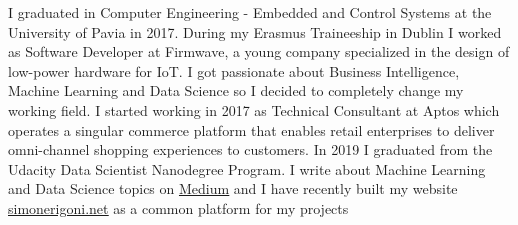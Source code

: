 \documentclass[9pt]{developercv} %
\begin{document}
\begin{minipage}[t]{0.5\textwidth} %
	\vspace{-\baselineskip} %
	
	I graduated in Computer Engineering - Embedded and Control Systems at the University of Pavia in 2017. During my Erasmus Traineeship in Dublin I worked as Software Developer at Firmwave, a young company specialized in the design of low-power hardware for IoT. I got passionate about Business Intelligence, Machine Learning and Data Science so I decided to completely change my working field. I started working in 2017 as Technical Consultant at Aptos which operates a singular commerce platform that enables retail enterprises to deliver omni-channel shopping experiences to customers. In 2019 I graduated from the Udacity Data Scientist Nanodegree Program. I write about Machine Learning and Data Science topics on \underline{\href{https://medium.com/@simone.rigoni01}{Medium}} and I have recently built my website \underline{\href{http://www.simonerigoni.net}{simonerigoni.net}} as a common platform for my projects
\end{minipage}
\hfill %
\begin{minipage}[t]{0.4\textwidth} %
	\vspace{-\baselineskip} %
	\begin{barchart}{5.5}
	\end{barchart}
\end{minipage}

\begin{center}
\end{center}


\end{document}
